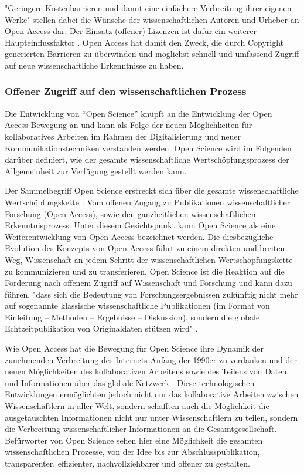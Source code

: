 "Geringere Kostenbarrieren und damit eine einfachere Verbreitung ihrer eigenen Werke" \cite{WD_bundestag_2009} stellen dabei die Wünsche der wissenschaftlichen Autoren und Urheber an Open Access dar. Der Einsatz (offener) Lizenzen ist dafür ein weiterer Haupteinflussfaktor \cite{cite:16}. Open Access hat damit den Zweck, die durch Copyright generierten Barrieren zu überwinden und möglichst schnell und umfassend Zugriff auf neue wissenschaftliche Erkenntnisse zu haben.

\subsubsection{Offener Zugriff auf den wissenschaftlichen Prozess}

Die Entwicklung von “Open Science” knüpft an die Entwicklung der Open Access-Bewegung an und kann als Folge der neuen Möglichkeiten für kollaboratives Arbeiten im Rahmen der Digitalisierung und neuer Kommunikationstechniken verstanden werden. Open Science wird im Folgenden darüber definiert, wie der gesamte wissenschaftliche Wertschöpfungsprozess der Allgemeinheit zur Verfügung gestellt werden kann.

Der Sammelbegriff Open Science erstreckt sich über die gesamte wissenschaftliche Wertschöpfungskette \cite{Scheliga_2014}: Vom offenen Zugang zu Publikationen wissenschaftlicher Forschung (Open Access), sowie den ganzheitlichen wissenschaftlichen Erkenntnisprozess. Unter diesem Gesichtspunkt kann Open Science als eine Weiterentwicklung von Open Access bezeichnet werden. Die diesbezügliche Evolution des Konzepts von Open Access führt zu einem direkten und breiten Weg, Wissenschaft an jedem Schritt der wissenschaftlichen Wertschöpfungskette zu kommunizieren und zu transferieren. Open Science ist die Reaktion auf die Forderung nach offenem Zugriff auf Wissenschaft und Forschung und kann dazu führen, "dass sich die Bedeutung von Forschungsergebnissen zukünftig nicht mehr auf sogenannte klassische wissenschaftliche Publikationen (im Format von Einleitung – Methoden – Ergebnisse – Diskussion), sondern die globale Echtzeitpublikation von Originaldaten stützen wird" \cite{Stengel_2013}.

Wie Open Access hat die Bewegung für Open Science ihre Dynamik der zunehmenden Verbreitung des Internets Anfang der 1990er zu verdanken \cite{Lievrouw_2010} und der neuen Möglichkeiten des kollaborativen Arbeitens sowie des Teilens von Daten und Informationen über das globale Netzwerk \cite{Meyer_2013}. Diese technologischen Entwicklungen ermöglichten jedoch nicht nur das kollaborative Arbeiten zwischen Wissenschaftlern in aller Welt, sondern schafften auch die Möglichkeit die ausgetauschten Informationen nicht nur unter Wissenschaftlern zu teilen, sondern die Verbreitung wissenschaftlicher Informationen an die Gesamtgesellschaft. Befürworter von Open Science sehen hier eine Möglichkeit die gesamten wissenschaftlichen Prozesse, von der Idee bis zur Abschlusspublikation, transparenter, effizienter, nachvollziehbarer und offener zu gestalten.

